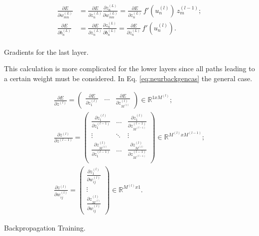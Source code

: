 \begin{Equation}[H]
	\centering
	\begin{equation} \label{eq:neurbaschainrulell}
		\begin{aligned}
			\frac{\partial E}{\partial w^{(L)}_{mn}} &= \frac{\partial E}{\partial z^{(L)}_n} \frac{\partial z^{(L)}_n}{\partial w^{(L)}_{mn}} = \frac{\partial E}{\partial z^{(L)}_n} \, f' \left( u^{(l)}_n \right) \, z^{(l-1)}_m ;\\
			\frac{\partial E}{\partial b^{(L)}_n} &= \frac{\partial E}{\partial z^{(L)}_n} \frac{\partial z^{(L)}_n}{\partial b^{(L)}_n} = \frac{\partial E}{\partial z^{(L)}_n} \, f' \left( u^{(l)}_n \right) .\\
		\end{aligned}
	\end{equation}
	\caption[Gradients for the last layer.]{Gradients for the last layer.}
\end{Equation}

\noindent This calculation is more complicated for the lower layers since all paths leading to a certain weight must be considered. In Eq. \ref{eq:neurbackgencas} the general case.

\begin{Equation}[H]
	\centering
	\begin{equation} \label{eq:neurbackgencas}
    	\begin{aligned}
    		\frac{\partial E}{\partial z^{(l)}} = 
    		    \begin{pmatrix} 
    		        \frac{\partial E}{\partial z^{(l)}_1} & \dots & \frac{\partial E}{\partial z^{(l)}_{M^{(l)}}}
    		    \end{pmatrix} \in \mathbb{R}^{1 x M^{(l)}}; \\[10pt]
    		\frac{\partial z^{(l)}}{\partial z^{(l-1)}} =
        		\begin{pmatrix}
        			\frac{\partial z^{(l)}_1}{\partial z^{(l-1)}_1} & \dots & \frac{\partial z^{(l)}_1}{\partial z^{(l-1)}_{M^{(l-1)}}} \\
        			\vdots & \ddots & \vdots \\
        			\frac{\partial z^{(l)}_{M^{(l)}}}{\partial z^{(l-1)}_1} & \dots & \frac{\partial z^{(l)}_{M^{(l)}}}{\partial z^{(l-1)}_{M^{(l-1)}}} \\
        		\end{pmatrix} \in \mathbb{R}^{M^{(l)} x M^{(l-1)}}; \\[10pt]
    		\frac{\partial z^{(l)}}{\partial w^{(l)}_{ij}} = 
    		    \begin{pmatrix} 
    		        \frac{\partial z^{(l)}_1}{\partial w^{(l)}_{ij}} \\
    		        \vdots \\
    		        \frac{\partial z^{(l)}_{M^{(l)}}}{\partial w^{(l)}_{ij}} 
    		    \end{pmatrix} \in {\mathbb{R}}^{M^{(l)} x 1}.
		\end{aligned}
	\end{equation}
	\caption[Backpropagation Training.]{Backpropagation Training.}
\end{Equation}

